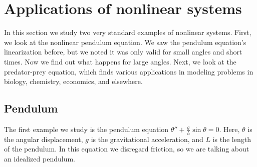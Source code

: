 
\sectionnewpage
\section{Applications of nonlinear systems}
\label{nlinapps:section}


In this section we study two very standard examples of nonlinear
systems.  First, we look at the nonlinear pendulum equation.  We saw
the pendulum equation's linearization before, but we noted it
was only valid for small angles and short times.  Now we find out what
happens for large angles.  Next, we look at the predator-prey equation,
which finds various applications in modeling problems in biology, chemistry,
economics, and elsewhere.

\subsection{Pendulum}

The first example we study is the pendulum equation
$\theta''+\frac{g}{L} \sin \theta = 0$.  Here, $\theta$ is the angular
displacement, $g$ is the gravitational acceleration, and $L$ is the length of
the pendulum.  In this equation we disregard friction, so we are talking
about an idealized pendulum.

